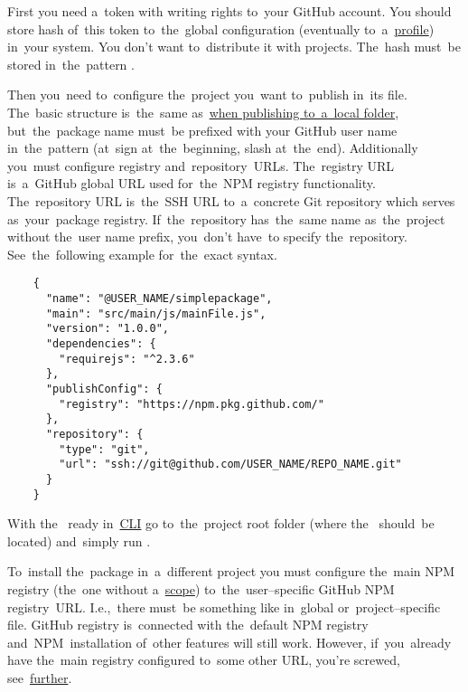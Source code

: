 \label{npmpublishgithub}
First you need a~token with writing rights to~your GitHub account.
You should store hash of~this token to~the~global  configuration (eventually to~a~\hyperref[npmprofile]{profile}) in~your system.
You don't want to~distribute it with projects.
The~hash must~be stored in~the~pattern .

Then you~need to~configure the~project you~want to~publish in~its  file.
The~basic structure is~the~same as~\hyperref[npmpublishlocal]{when publishing to~a~local folder}, but~the~package name must~be prefixed with your GitHub user name in~the~pattern  (at~sign at~the~beginning, slash at~the~end).
Additionally you~must configure registry and~repository~URLs.
The~registry URL is~a~GitHub global URL used for~the~NPM registry functionality.
The~repository URL is~the~SSH URL to~a~concrete Git repository which serves as~your~package registry.
If~the~repository has~the~same name as~the~project without the~user name prefix, you~don't have~to specify the~repository.
See~the~following example for~the~exact syntax.

\begin{lstlisting}
    {
      "name": "@USER_NAME/simplepackage",
      "main": "src/main/js/mainFile.js",
      "version": "1.0.0",
      "dependencies": {
        "requirejs": "^2.3.6"
      },
      "publishConfig": {
        "registry": "https://npm.pkg.github.com/"
      },
      "repository": {
        "type": "git",
        "url": "ssh://git@github.com/USER_NAME/REPO_NAME.git"
      }
    }
\end{lstlisting}

\noindent With the~ ready in~\hyperref[shellcligui]{CLI} go to~the~project root folder (where the~ should~be located) and~simply run .
\newline

\noindent To~install the~package in~a~different project you must configure the~main NPM registry (the~one without a~\hyperref[npmscope]{scope}) to~the~user--specific GitHub NPM registry~URL.
I.e.,~there must~be something like  in~global or~project--specific  file.
GitHub registry is~connected with the~default NPM registry and~NPM~installation of~other features will still work.
However, if~you~already have the~main registry configured to~some other URL,  you're screwed, see~\hyperref[multipleregistries]{further}.

